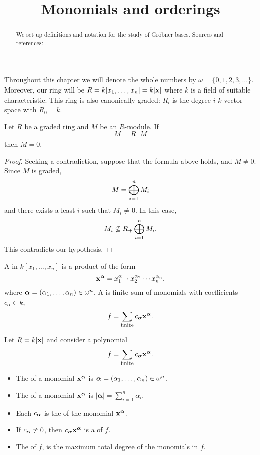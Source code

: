 \documentclass{ximera}
\title{Monomials and orderings}
\begin{document}
\begin{abstract}
  We set up definitions and notation for the study of Gr\"obner 
  bases. Sources and references: \cite{CLO2007}.
\end{abstract}
\maketitle

Throughout this chapter we will denote the whole numbers by $\omega =
\{0,1,2,3,\dots\}$. Moreover, our ring will be $R=k[x_1,\dots,x_n] =
k[\mathbf{x}]$ where $k$ is a field of suitable characteristic. This ring is
also canonically graded: $R_i$ is the degree-$i$ $k$-vector space with
$R_0=k$.

\begin{theorem}
  Let $R$ be a graded ring and $M$ be an $R$-module. If
  \[
  M = R_+ M 
  \]
  then $M=0$.
  \begin{proof}
    Seeking a contradiction, suppose that the formula above holds, and
    $M\ne0$. Since $M$ is graded,
    \[
    M = \bigoplus_{i=1}^n M_i
    \]
    and there exists a least $i$ such that $M_i \ne 0$. In this case,
    \[
    M_i \not\subseteq R_+\bigoplus_{i=1}^n M_i.
    \]
    This contradicts our hypothesis.
  \end{proof}
\end{theorem}

\begin{definition}
  A  in $k[x_1,\dots,x_n]$ is a product of the form
  \[
  \mathbf{x}^{{\boldsymbol\alpha}} = x_1^{\alpha_1}\cdot x_2^{\alpha_2}  \cdots x_n^{\alpha_n}.
  \]
  where ${\boldsymbol\alpha} = (\alpha_1,\dots,\alpha_n) \in
  \omega^n$.  A  is finite sum of monomials with
  coefficients $c_\alpha\in k$,
  \[
  f = \sum_{\mathrm{finite}} c_{{\boldsymbol\alpha}} \mathbf{x}^{{\boldsymbol\alpha}}.
  \]
\end{definition}


\begin{definition}
  Let $R = k[\mathbf{x}]$ and consider a polynomial
  \[
  f =  \sum_{\mathrm{finite}} c_{{\boldsymbol\alpha}} \mathbf{x}^{{\boldsymbol\alpha}}.
  \]
  \begin{itemize}
    \item The  of a monomial $\mathbf{x}^{{\boldsymbol\alpha}}$ is
      ${\boldsymbol\alpha}=(\alpha_1,\dots,\alpha_n)\in \omega^n$.
    \item The  of a monomial $\mathbf{x}^{{\boldsymbol\alpha}}$ is
      $|\boldsymbol{\alpha}| = \sum_{i=1}^n \alpha_i$.
    \item Each $c_{{\boldsymbol\alpha}}$ is the  of the
      monomial $\mathbf{x}^{{\boldsymbol\alpha}}$.
    \item If $c_{{\boldsymbol\alpha}} \ne 0$, then
      $c_{{\boldsymbol\alpha}}\mathbf{x}^{{\boldsymbol\alpha}}$ is a  of
      $f$.
    \item The  of $f$, is the maximum total degree
      of the monomials in $f$.
  \end{itemize}
\end{definition}
\end{document}
